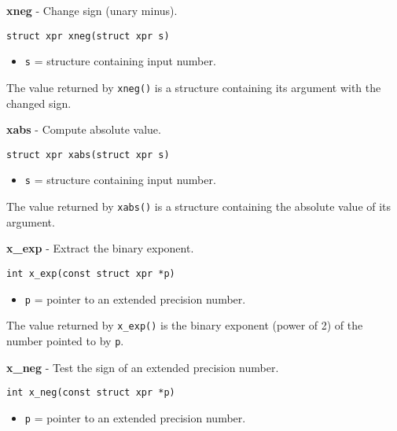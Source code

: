 \documentclass{article}
\begin{document}
\hrulefill{}

\textbf{xneg} - Change sign (unary minus).

\begin{verbatim}
struct xpr xneg(struct xpr s)
\end{verbatim}

\begin{itemize}
\item \texttt{s} = structure containing input number.
\end{itemize}

The value returned by \texttt{xneg()} is a structure containing
its argument with the changed sign.


\hrulefill{}

\textbf{xabs} - Compute absolute value.

\begin{verbatim}
struct xpr xabs(struct xpr s)
\end{verbatim}

\begin{itemize}
\item \texttt{s} = structure containing input number.
\end{itemize}

The value returned by \texttt{xabs()} is a structure containing
the absolute value of its argument.


\hrulefill{}

\textbf{x\_exp} - Extract the binary exponent.

\begin{verbatim}
int x_exp(const struct xpr *p)
\end{verbatim}

\begin{itemize}
\item \texttt{p} = pointer to an extended precision number.
\end{itemize}

The value returned by \texttt{x\_exp()} is the binary exponent 
(power of 2) of the number pointed to by \texttt{p}.


\hrulefill{}

\textbf{x\_neg} - Test the sign of an extended precision number.

\begin{verbatim}
int x_neg(const struct xpr *p)
\end{verbatim}

\begin{itemize}
\item \texttt{p} = pointer to an extended precision number.
\end{itemize}
\end{document}
